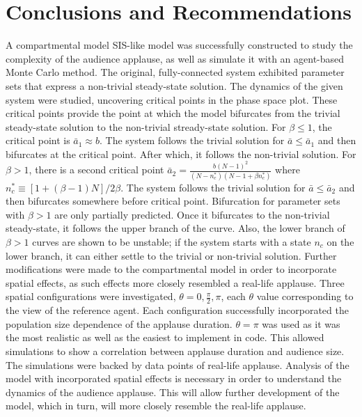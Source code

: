\chapter{Conclusions and Recommendations}
\label{conclusions}

\hspace{\parindent} A compartmental model SIS-like model was successfully constructed to study the complexity of the audience applause, as well as simulate it with an agent-based Monte Carlo method. 
The original, fully-connected system exhibited parameter sets that express a  non-trivial steady-state solution. The dynamics of the given system were studied, uncovering critical points in the phase space plot. 
These critical points provide the point at which the model bifurcates from the trivial steady-state solution to the non-trivial stready-state solution.
For $\beta \leq 1$, the critical point is $\bar{a}_{1} \approx b$.
The system follows the trivial solution for $\bar{a} \leq \bar{a}_{1}$ and then bifurcates at the critical point.
After which, it follows the non-trivial solution.
For $\beta > 1$, there is a second critical point $\bar{a}_2 = \frac{b(N-1)^{2}}{(N-n_{c}^{*})(N-1+\beta n_{c}^{*})}$ where $n_{c}^{*} \equiv [1+(\beta-1)N]/2\beta$.
The system follows the trivial solution for $\bar{a} \leq \bar{a}_{2}$ and then bifurcates somewhere before critical point.
Bifurcation for parameter sets with $\beta > 1$ are only partially predicted.
Once it bifurcates to the non-trivial steady-state, it follows the upper branch of the curve.
Also, the lower branch of $\beta >1$ curves are shown to be unstable; if the system starts with a state $n_{c}$ on the lower branch, it can either settle to the trivial or non-trivial solution.
Further modifications were made to the compartmental model in order to incorporate spatial effects, as such effects more closely resembled a real-life applause.
Three spatial configurations were investigated, $\theta = 0, \frac{\pi}{2}, \pi$, each $\theta$ value corresponding to the view of the reference agent.
Each configuration successfully incorporated the population size dependence of the applause duration.
$\theta = \pi$ was used as it was the most realistic as well as the easiest to implement in code.
This allowed simulations to show a correlation between applause duration and audience size.
The simulations were backed by data points of real-life applause.
Analysis of the model with incorporated spatial effects is necessary in order to understand the dynamics of the audience applause.
This will allow further development of the model, which in turn, will more closely resemble the real-life applause.

